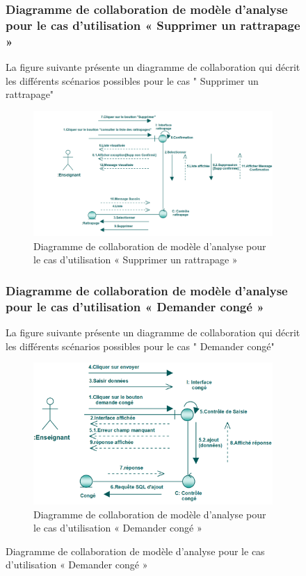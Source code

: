 \documentclass[12 pt]{report}
\begin{document}
\begin{figure}[h]
\begin{center}
\subsubsection{Diagramme  de  collaboration  de  modèle  d'analyse  pour  le  cas  d'utilisation « Supprimer un rattrapage »  }
La figure suivante présente un diagramme de collaboration qui décrit les différents
scénarios possibles pour le cas " Supprimer un rattrapage"
\begin{figure}[h]
\begin{center}
\includegraphics[width= 14 cm , height =6 cm]{colla_ens_supprimerrattrapage.png}
 \caption{Diagramme  de  collaboration  de  modèle  d'analyse  pour  le  cas  d'utilisation « Supprimer un rattrapage »}
\end{center}
\end{figure} 
\subsubsection{Diagramme  de  collaboration  de  modèle  d'analyse  pour  le  cas  d'utilisation « Demander  congé »  }
La figure suivante présente un diagramme de collaboration qui décrit les différents
scénarios possibles pour le cas " Demander  congé"
\begin{figure}[h]
\begin{center}
\includegraphics[width= 14 cm , height =5.5 cm]{colla_ens_demandeconge.png}
 \caption{Diagramme  de  collaboration  de  modèle  d'analyse  pour  le  cas  d'utilisation « Demander  congé »}
\end{center}
\end{figure}

\end{center}
\end{figure}
\end{document}
